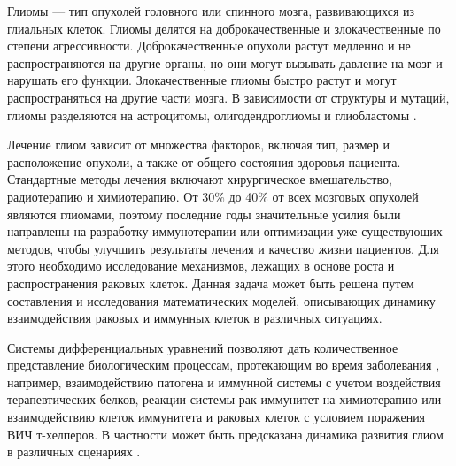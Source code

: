 \documentclass[14pt,a4paper]{extarticle}
\begin{document}
	\begin{introduction}
	
	Глиомы --- тип опухолей головного или спинного мозга, развивающихся из глиальных клеток. Глиомы делятся на доброкачественные и злокачественные по степени агрессивности.  Доброкачественные опухоли растут медленно и не распространяются на другие органы, но они могут вызывать давление на мозг и нарушать его функции. Злокачественные глиомы быстро растут и могут распространяться на другие части мозга. В зависимости от структуры и мутаций, глиомы разделяются на астроцитомы, олигодендроглиомы и глиобластомы \cite{glioma_classification}.
	
	Лечение глиом зависит от множества факторов, включая тип, размер и расположение опухоли, а также от общего состояния здоровья пациента. Стандартные методы лечения включают хирургическое вмешательство, радиотерапию и химиотерапию. От 30\% до 40\% от всех мозговых опухолей \cite{glioma_overview} являются глиомами, поэтому последние годы значительные усилия были направлены на разработку иммунотерапии или оптимизации уже существующих методов, чтобы улучшить результаты лечения и качество жизни пациентов. Для этого необходимо исследование механизмов, лежащих в основе роста и распространения раковых клеток. Данная задача может быть решена путем составления и исследования математических моделей, описывающих динамику взаимодействия раковых и иммунных клеток в различных ситуациях. 
	
	Системы дифференциальных уравнений позволяют дать количественное представление биологическим процессам, протекающим во время заболевания \cite{abt_DEs}, например, взаимодействию патогена и иммунной системы с учетом воздействия терапевтических белков\cite{Kasbawati et.al.}, реакции системы рак-иммунитет на химиотерапию\cite{W. L. Duan et.al.,Xiangdong Liu et.al.,L.G. de Pillis et.al., dePillis L.G. et.al.} или взаимодействию клеток иммунитета и раковых клеток с условием поражения ВИЧ т-хелперов\cite{F. A. Rihan et.al.}. В частности может быть предсказана динамика развития глиом в различных сценариях \cite{gliomae_scenarios}.
	

\end{introduction}
\end{document}
